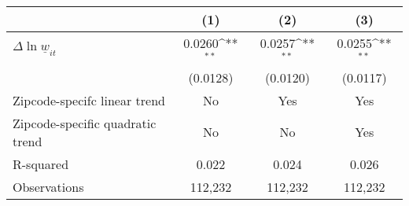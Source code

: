 {
\def\sym#1{\ifmmode^{#1}\else\(^{#1}\)\fi}
\begin{tabular}{l*{3}{c}}
\hline\hline
          &\multicolumn{1}{c}{(1)}         &\multicolumn{1}{c}{(2)}         &\multicolumn{1}{c}{(3)}         \\
\hline
$\Delta \ln \underline{w}_{it}$&   0.0260\sym{**} &   0.0257\sym{**} &   0.0255\sym{**} \\
          & (0.0128)         & (0.0120)         & (0.0117)         \\
\hline
Zipcode-specifc linear trend&       No         &      Yes         &      Yes         \\
Zipcode-specific quadratic trend&       No         &       No         &      Yes         \\
R-squared &    0.022         &    0.024         &    0.026         \\
Observations&  112,232         &  112,232         &  112,232         \\
\hline\hline
\end{tabular}
}
